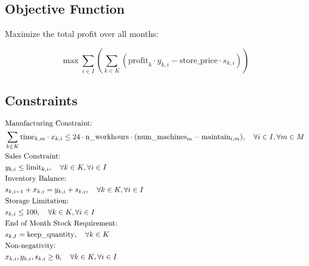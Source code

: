 \documentclass{article}
\begin{document}
\subsection*{Objective Function}

Maximize the total profit over all months:

\[
\max \sum_{i \in I} \left( \sum_{k \in K} \left( \text{profit}_k \cdot y_{k,i} - \text{store\_price} \cdot s_{k,i} \right) \right)
\]

\subsection*{Constraints}

\begin{align}
    &\text{Manufacturing Constraint:} \notag \\
    &\sum_{k \in K} \text{time}_{k,m} \cdot x_{k,i} \leq 24 \cdot \text{n\_workhours} \cdot (\text{num\_machines}_m - \text{maintain}_{i,m}), \quad \forall i \in I, \forall m \in M \\
    &\text{Sales Constraint:} \notag \\
    &y_{k,i} \leq \text{limit}_{k,i}, \quad \forall k \in K, \forall i \in I \\
    &\text{Inventory Balance:} \notag \\
    &s_{k,i-1} + x_{k,i} = y_{k,i} + s_{k,i}, \quad \forall k \in K, \forall i \in I \\
    &\text{Storage Limitation:} \notag \\
    &s_{k,i} \leq 100, \quad \forall k \in K, \forall i \in I \\
    &\text{End of Month Stock Requirement:} \notag \\
    &s_{k,I} = \text{keep\_quantity}, \quad \forall k \in K \\
    &\text{Non-negativity:} \notag \\
    &x_{k,i}, y_{k,i}, s_{k,i} \geq 0, \quad \forall k \in K, \forall i \in I
\end{align}
\end{document}
